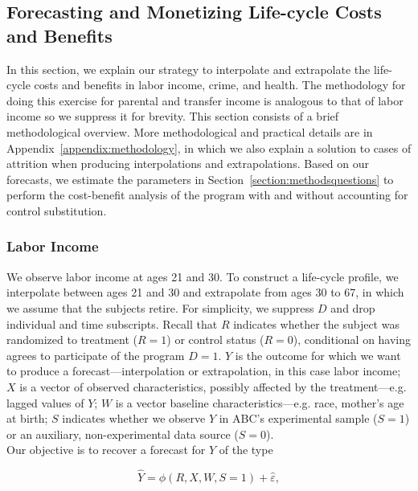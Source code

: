 \subsection{Forecasting and Monetizing Life-cycle Costs and Benefits}

\noindent In this section, we explain our strategy to interpolate and extrapolate the life-cycle costs and benefits in labor income, crime, and health. The methodology for doing this exercise for parental and transfer income is analogous to that of labor income so we suppress it for brevity. This section consists of a brief methodological overview. More methodological and practical details are in Appendix~\ref{appendix:methodology}, in which we also explain a solution to cases of attrition when producing interpolations and extrapolations. Based on our forecasts, we estimate the parameters in Section~\ref{section:methodsquestions} to perform the cost-benefit analysis of the program with and without accounting for control substitution.

\subsubsection{Labor Income}

\noindent We observe labor income at ages 21 and 30. To construct a life-cycle profile, we interpolate between ages 21 and 30 and extrapolate from ages 30 to 67, in which we assume that the subjects retire. For simplicity, we suppress $D$ and drop individual and time subscripts. Recall that $R$ indicates whether the subject was randomized to treatment ($R=1$) or control status ($R=0$), conditional on having agrees to participate of the program $D = 1$. $Y$ is the outcome for which we want to produce a forecast---interpolation or extrapolation, in this case labor income; $X$ is a vector of observed characteristics, possibly affected by the treatment---e.g. lagged values of $Y$; $W$ is a vector baseline characteristics---e.g. race, mother's age at birth; $S$ indicates whether we observe $Y$ in ABC's experimental sample ($S=1$) or an auxiliary, non-experimental data source ($S=0$).\\

\noindent Our objective is to recover a forecast for $Y$ of the type

\begin{equation}
\widehat{Y} = \widehat{\phi} \left( R, X, W, S = 1 \right) + \widehat{\varepsilon},   \label{eq:additive}
\end{equation}

